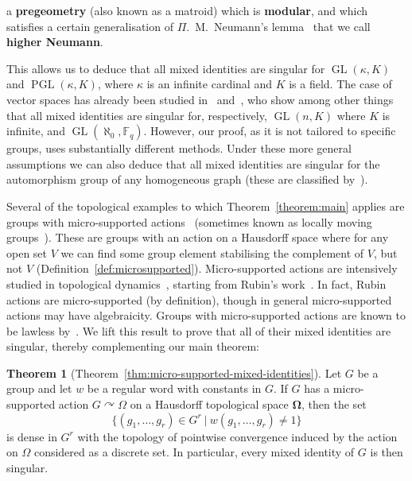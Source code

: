 \documentclass{article}
\theoremstyle{remark}
\theoremstyle{definition}
\def\acts{\curvearrowright}
\DeclareMathOperator{\GL}{GL}
\DeclareMathOperator{\PGL}{PGL}
\newcommand{\spOm}{\bm{\Omega}}
\newtheorem{thmx}{Theorem}
\begin{document}
a \textbf{pregeometry} (also known as a matroid) which is \textbf{modular}, and which satisfies a certain generalisation of $\Pi$.~M.~Neumann's lemma~\cite{neumann1976structure} that we call \textbf{higher Neumann}. {This allows us to deduce that all mixed identities are singular for $\GL(\kappa, K)$ and $\PGL(\kappa, K)$, where $\kappa$ is an infinite cardinal and $K$ is a field. {The case of vector spaces has already been studied in~\cite{golubchik1982generalized} and~\cite{bradford2023non}, who show among other things
that all mixed identities are singular for, respectively, $\GL(n, K)$ where $K$ is infinite, and $\GL(\aleph_0, \mathbb{F}_q)$.}
{However, our proof, as it is not tailored to specific groups, uses substantially different methods.} %
Under these more general assumptions we can also deduce that all mixed identities are singular for the automorphism group of any homogeneous graph (these are classified by~\cite{lachlan1980countable}). 

{Several of the topological examples to which Theorem~\ref{theorem:main} applies are groups with micro-supported actions~\cite{caprace2017locally} (sometimes known as locally moving groups~\cite{rubin1996locally}). These are groups with an action on a Hausdorff space where for any open set $V$ we can find some group element stabilising the complement of $V$, but not $V$ (Definition~\ref{def:microsupported}). Micro-supported actions are intensively studied in topological dynamics~\cite{nekrashevych2022groups, caprace2017locally, francoeur2021stabilisers}, starting from Rubin's work~\cite{rubin1989reconstruction, rubin1996locally, mccleary2005locally, ben2010reconstruction}. In fact, Rubin actions are micro-supported (by definition), though in general micro-supported actions may have algebraicity. Groups with micro-supported actions are known to be lawless by~\cite{nekrashevych2022groups}. We lift {this} result to   prove that all of their mixed identities are singular, thereby complementing our main theorem:}
\begin{thmx}[{Theorem~\ref{thm:micro-supported-mixed-identities}}]\label{mainthm:micro} 
Let $G$ be a group and let $w$ be a regular word with constants in $G$. If $G$ has a micro-supported action $G\acts \Omega$ on a Hausdorff topological space $\spOm$, then the set
\[
  \{(g_1,\ldots,g_r)\in G^r\ | \ w(g_1,\ldots,g_r)\neq 1\}
\]
is dense in $G^r$ with the topology of pointwise convergence induced by the action {on $\Omega$ considered as a discrete set.} %
In particular, every mixed identity of $G$ is then  singular.
\end{thmx}

}
\end{document}
